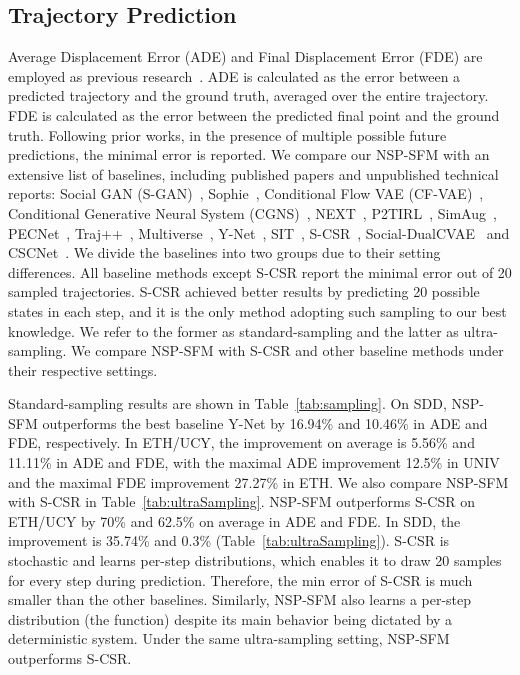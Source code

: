 \documentclass[runningheads]{llncs}
\newcommand{\Tabref}[1]{Table~\ref{tab:#1}}
\begin{document}
\subsection{Trajectory Prediction}
Average Displacement Error (ADE) and Final Displacement Error (FDE) are employed as previous research~\cite{alahi2016social,gupta2018social,mangalam2020not,mangalam2021goals}. ADE is calculated as the  error between a predicted trajectory and the
ground truth, averaged over the entire trajectory. FDE is calculated as the  error between the predicted final point and the ground truth. Following prior works, in the presence of multiple possible future predictions, the minimal error is reported. We compare our NSP-SFM with an extensive list of baselines, including published papers and unpublished technical reports: Social GAN (S-GAN)~\cite{gupta2018social}, Sophie~\cite{sadeghian2019sophie}, Conditional Flow VAE (CF-VAE)~\cite{bhattacharyya2019conditional}, Conditional Generative Neural System (CGNS)~\cite{li2019conditional}, NEXT~\cite{liang2019peeking}, P2TIRL~\cite{deo2020trajectory}, SimAug~\cite{liang2020simaug},  PECNet~\cite{mangalam2020not}, Traj++~\cite{salzmann2020trajectron++}, Multiverse~\cite{liang2020garden}, Y-Net~\cite{mangalam2021goals}, SIT~\cite{su2021pedestrian}, S-CSR~\cite{zhou2021sliding}, Social-DualCVAE~\cite{gao2022social} and CSCNet~\cite{xia2022cscnet}. We divide the baselines into two groups due to their setting differences. All baseline methods except S-CSR report the minimal error out of 20 sampled trajectories. S-CSR achieved better results by predicting 20 possible states in each step, and it is the only method adopting such sampling to our best knowledge. We refer to the former as standard-sampling and the latter as ultra-sampling. We compare NSP-SFM with S-CSR and other baseline methods under their respective settings.

Standard-sampling results are shown in \Tabref{sampling}. On SDD, NSP-SFM outperforms the best baseline Y-Net by 16.94\% and 10.46\% in ADE and FDE, respectively. In ETH/UCY, the improvement on average is 5.56\% and 11.11\% in ADE and FDE, with the maximal ADE improvement 12.5\% in UNIV and the maximal FDE improvement 27.27\% in ETH. We also compare NSP-SFM with S-CSR in \Tabref{ultraSampling}. NSP-SFM outperforms S-CSR on ETH/UCY by 70\% and 62.5\% on average in ADE and FDE. In SDD, the improvement is 35.74\% and 0.3\% (\Tabref{ultraSampling}). S-CSR is stochastic and learns per-step distributions, which enables it to draw 20 samples for every step during prediction. Therefore, the min error of S-CSR is much smaller than the other baselines. Similarly, NSP-SFM also learns a per-step distribution (the  function) despite its main behavior being dictated by a deterministic system. Under the same ultra-sampling setting, NSP-SFM outperforms S-CSR.
\end{document}
